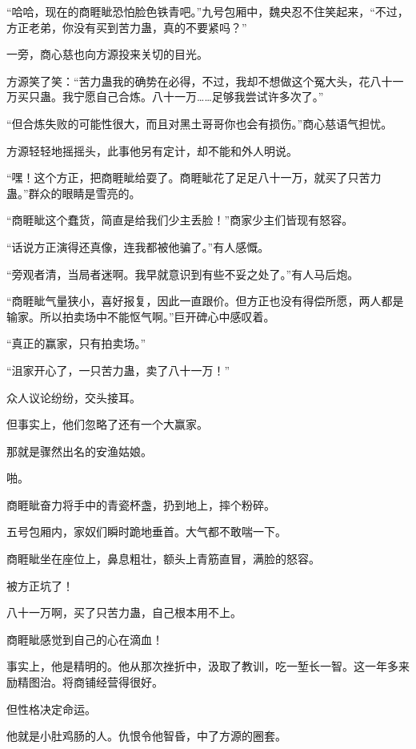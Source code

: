 
\begin{this_body}

“哈哈，现在的商睚眦恐怕脸色铁青吧。”九号包厢中，魏央忍不住笑起来，“不过，方正老弟，你没有买到苦力蛊，真的不要紧吗？”

一旁，商心慈也向方源投来关切的目光。

方源笑了笑：“苦力蛊我的确势在必得，不过，我却不想做这个冤大头，花八十一万买只蛊。我宁愿自己合炼。八十一万……足够我尝试许多次了。”

“但合炼失败的可能性很大，而且对黑土哥哥你也会有损伤。”商心慈语气担忧。

方源轻轻地摇摇头，此事他另有定计，却不能和外人明说。

“嘿！这个方正，把商睚眦给耍了。商睚眦花了足足八十一万，就买了只苦力蛊。”群众的眼睛是雪亮的。

“商睚眦这个蠢货，简直是给我们少主丢脸！”商家少主们皆现有怒容。

“话说方正演得还真像，连我都被他骗了。”有人感慨。

“旁观者清，当局者迷啊。我早就意识到有些不妥之处了。”有人马后炮。

“商睚眦气量狭小，喜好报复，因此一直跟价。但方正也没有得偿所愿，两人都是输家。所以拍卖场中不能怄气啊。”巨开碑心中感叹着。

“真正的赢家，只有拍卖场。”

“沮家开心了，一只苦力蛊，卖了八十一万！”

众人议论纷纷，交头接耳。

但事实上，他们忽略了还有一个大赢家。

那就是骤然出名的安渔姑娘。

啪。

商睚眦奋力将手中的青瓷杯盏，扔到地上，摔个粉碎。

五号包厢内，家奴们瞬时跪地垂首。大气都不敢喘一下。

商睚眦坐在座位上，鼻息粗壮，额头上青筋直冒，满脸的怒容。

被方正坑了！

八十一万啊，买了只苦力蛊，自己根本用不上。

商睚眦感觉到自己的心在滴血！

事实上，他是精明的。他从那次挫折中，汲取了教训，吃一堑长一智。这一年多来励精图治。将商铺经营得很好。

但性格决定命运。

他就是小肚鸡肠的人。仇恨令他智昏，中了方源的圈套。


\end{this_body}
